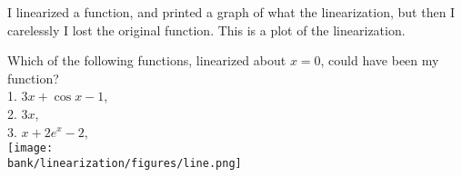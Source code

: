  
 I linearized a function, and printed a graph of what the linearization, but then I carelessly I lost the original function. This is a plot of the linearization.

    Which of the following functions, linearized about $x=0$, could have been my function? \\

    1. $3x + \cos x - 1$, \\
	2. $3x$,\\
	3. $x + 2e^x - 2$,\\

    \texttt{[image: \\bank/linearization/figures/line.png]}

    
